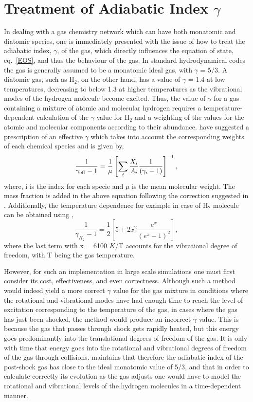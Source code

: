 \documentclass[useAMS,usenatbib]{mn2e}
\begin{document}
\section{Treatment of Adiabatic Index $\gamma$}
In dealing with a gas chemistry network which can have both monatomic and diatomic
species, one is immediately presented with the issue of how to treat the adiabatic
index, $\gamma$, of the gas, which directly influences the equation of
state, eq.~\ref{EOS}, and thus the behaviour of the gas.
In standard hydrodynamical codes the gas is generally
assumed to be a monatomic ideal gas, with $\gamma$ = 5/3. 
A diatomic gas, such as H$_{2}$, on the other hand, has a value of $\gamma$
= 1.4 at low temperatures, decreasing to below 1.3
at higher temperatures as the vibrational modes of the hydrogen molecule become
excited. Thus, the value of $\gamma$ for a gas containing a mixture of atomic and
molecular hydrogen requires a temperature-dependent calculation of the $\gamma$
value for H$_2$ and a weighting of the values for the atomic and molecular components
according to their abundance. \cite{Yoshida:2006p13376} have suggested
a prescription of an effective $\gamma$ which takes into account the
corresponding weights of each chemical species and is given by,
\begin{equation}
\frac{1}{\gamma_{\rm eff} - 1} = \frac{1}{\mu}\left[\sum_{i}\frac{X_{i}}{A_{i}}\frac{1}{(\gamma_{i} - 1)}\right]^{-1},
\label{eq:gammaeff}
\end{equation}
where, i is the index for each specie and $\mu$ is the mean molecular
weight. The mass fraction is added in the above equation following the
correction suggested in \cite{OSullivan:2009p10078}.
Additionally, the temperature dependence for example in case of
H$_{2}$ molecule can be obtained using \cite{landau:1980},
\begin{equation}
\frac{1}{\gamma_{H_{2}} - 1} = \frac{1}{2}\left[ 5 +
  2x^{2}\frac{e^{x}}{(e^{x} - 1)^{2}}\right],
\label{eq:gammaH2}
\end{equation}
where the last term with  x = 6100 $K$/T accounts for the vibrational
degree of freedom, with T being the gas temperature.
%

However, for such an implementation in large scale simulations one must first
consider its cost, effectiveness, and even correctness. Although such
a method would indeed yield a more correct $\gamma$ value for the gas
mixture in conditions where the rotational and vibrational modes have
had enough time to reach the level of excitation corresponding to
the temperature of the gas, in cases where the gas has just been
shocked, the method would produce an incorrect $\gamma$ value. 
This is because the gas that passes through shock gets rapidly heated, 
but this energy goes predominantly into the translational degrees of
freedom of the gas. It is only with time that energy goes into the rotational and
vibrational degrees of freedom of the gas through collisions. 
\cite{Flower:2003p11236} maintains that therefore the adiabatic index of
the post-shock gas has close to the ideal monatomic value of 5/3, 
and that in order to calculate correctly its evolution as the gas 
adjusts one would have to model the rotational and vibrational 
levels of the hydrogen molecules in a time-dependent manner.
%
\end{document}
